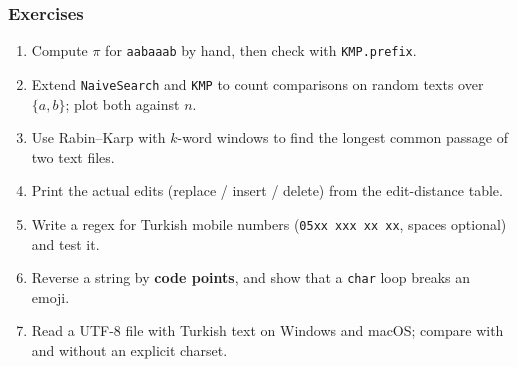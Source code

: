 \documentclass[aspectratio=169,10pt,compress]{beamer}
\begin{document}
\begin{frame}[t,fragile] \frametitle{Exercises}
  \begin{enumerate}\small
    \item Compute $\pi$ for \texttt{aabaaab} by hand, then check with \texttt{KMP.prefix}.
    \item Extend \texttt{NaiveSearch} and \texttt{KMP} to count comparisons on random texts over $\{a, b\}$; plot both against $n$.
    \item Use Rabin--Karp with $k$-word windows to find the longest common passage of two text files.
    \item Print the actual edits (replace / insert / delete) from the edit-distance table.
    \item Write a regex for Turkish mobile numbers (\texttt{05xx xxx xx xx}, spaces optional) and test it.
    \item Reverse a string by \textbf{code points}, and show that a \texttt{char} loop breaks an emoji.
    \item Read a UTF-8 file with Turkish text on Windows and macOS; compare with and without an explicit charset.
  \end{enumerate}
\end{frame}




\begin{frame}[t,fragile]
	\begin{center}
		\vspace{4cm}
	\end{center}
\end{frame}
\end{document}
